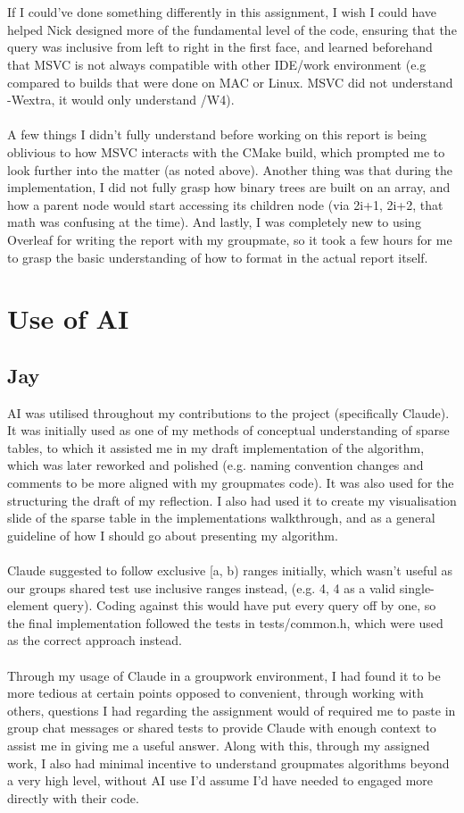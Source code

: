 \documentclass{article}
\theoremstyle{definition}
\begin{document}
\\
\\
If I could’ve done something differently in this assignment, I wish I could have helped Nick designed more of the fundamental level of the code, ensuring that the query was inclusive from left to right in the first face, and learned beforehand that MSVC is not always compatible with other IDE/work environment (e.g compared to builds that were done on MAC or Linux. MSVC did not understand -Wextra, it would only understand /W4).
\\
\\
A few things I didn’t fully understand before working on this report is being oblivious to how MSVC interacts with the CMake build, which prompted me to look further into the matter (as noted above). Another thing was that during the implementation, I did not fully grasp how binary trees are built on an array, and how a parent node would start accessing its children node (via 2i+1, 2i+2, that math was confusing at the time). And lastly, I was completely new to using Overleaf for writing the report with my groupmate, so it took a few hours for me to grasp the basic understanding of how to format in the actual report itself.
\section{Use of AI}
\subsection{Jay}
AI was utilised throughout my contributions to the project (specifically Claude). It was initially used as one of my methods of conceptual understanding of sparse tables, to which it assisted me in my draft implementation of the algorithm, which was later reworked and polished (e.g. naming convention changes and comments to be more aligned with my groupmates code). It was also used for the structuring the draft of my reflection. I also had used it to create my visualisation slide of the sparse table in the implementations walkthrough, and as a general guideline of how I should go about presenting my algorithm.
\\
\\
Claude suggested to follow exclusive [a, b) ranges initially, which wasn't useful as our groups shared test use inclusive ranges instead, (e.g. {4, 4} as a valid single-element query).
Coding against this would have put every query off by one, so the final implementation followed the tests in tests/common.h, which were used as the correct approach instead.
\\
\\
Through my usage of Claude in a groupwork environment, I had found it to be more tedious at certain points opposed to convenient, through working with others, questions I had regarding the assignment would of required me to paste in group chat messages or shared tests to provide Claude with enough context to assist me in giving me a useful answer. Along with this, through my assigned work, I also had minimal incentive to understand groupmates algorithms beyond a very high level, without AI use I'd assume I'd have needed to engaged more directly with their code.
\end{document}
